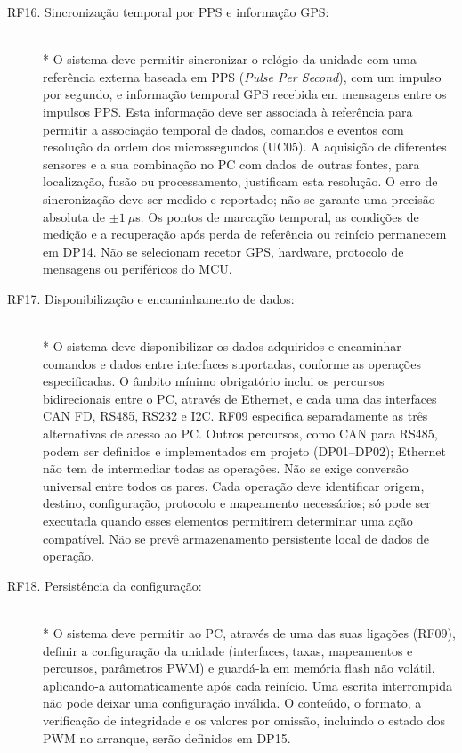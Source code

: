 \begin{description}
    \item[RF16. Sincronização temporal por PPS e informação GPS:] \hfill\\*
    O sistema deve permitir sincronizar o relógio da unidade com uma
    referência externa baseada em PPS (\textit{Pulse Per Second}), com
    um impulso por segundo, e informação temporal GPS recebida em
    mensagens entre os impulsos PPS. Esta informação deve ser associada
    à referência para permitir a associação temporal de dados, comandos
    e eventos com resolução da ordem dos microssegundos (UC05).
    A aquisição de diferentes sensores e a sua combinação no PC com
    dados de outras fontes, para localização, fusão ou processamento,
    justificam esta resolução. O erro de sincronização deve ser medido e
    reportado; não se garante uma precisão absoluta de $\pm1~\mu$s.
    Os pontos de marcação temporal, as condições de medição e a recuperação
    após perda de referência ou reinício permanecem em DP14. Não se
    selecionam recetor GPS, hardware, protocolo de mensagens ou periféricos
    do MCU.

    \item[RF17. Disponibilização e encaminhamento de dados:] \hfill\\*
    O sistema deve disponibilizar os dados adquiridos e encaminhar comandos
    e dados entre interfaces suportadas, conforme as operações especificadas.
    O âmbito mínimo obrigatório inclui os percursos bidirecionais entre
    o PC, através de Ethernet, e cada uma das interfaces CAN FD, RS485, RS232
    e I2C. RF09 especifica separadamente as três
    alternativas de acesso ao PC. Outros percursos, como CAN para RS485,
    podem ser definidos e implementados em projeto (DP01--DP02); Ethernet
    não tem de intermediar todas as operações. Não se exige conversão
    universal entre todos os pares.
    Cada operação deve identificar origem, destino, configuração,
    protocolo e mapeamento necessários; só pode ser executada quando
    esses elementos permitirem determinar uma ação compatível.
    Não se prevê armazenamento persistente local de dados de operação.

    \item[RF18. Persistência da configuração:] \hfill\\*
    O sistema deve permitir ao PC, através de uma das suas ligações (RF09),
    definir a configuração da unidade (interfaces, taxas, mapeamentos e
    percursos, parâmetros PWM) e guardá-la em memória flash não volátil,
    aplicando-a automaticamente após cada reinício. Uma escrita interrompida
    não pode deixar uma configuração inválida. O conteúdo, o formato, a
    verificação de integridade e os valores por omissão, incluindo o estado
    dos PWM no arranque, serão definidos em DP15.
\end{description}

